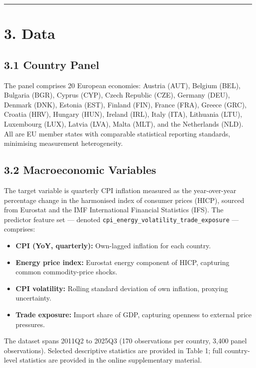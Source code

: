 \documentclass[
]{article}
\providecommand{\tightlist}{%
  \setlength{\itemsep}{0pt}\setlength{\parskip}{0pt}}
\begin{document}
\begin{center}\rule{0.5\linewidth}{0.5pt}\end{center}

\section{3. Data}\label{data}

\subsection{3.1 Country Panel}\label{country-panel}

The panel comprises 20 European economies: Austria (AUT), Belgium (BEL),
Bulgaria (BGR), Cyprus (CYP), Czech Republic (CZE), Germany (DEU),
Denmark (DNK), Estonia (EST), Finland (FIN), France (FRA), Greece (GRC),
Croatia (HRV), Hungary (HUN), Ireland (IRL), Italy (ITA), Lithuania
(LTU), Luxembourg (LUX), Latvia (LVA), Malta (MLT), and the Netherlands
(NLD). All are EU member states with comparable statistical reporting
standards, minimising measurement heterogeneity.

\subsection{3.2 Macroeconomic Variables}\label{macroeconomic-variables}

The target variable is quarterly CPI inflation measured as the
year-over-year percentage change in the harmonised index of consumer
prices (HICP), sourced from Eurostat and the IMF International Financial
Statistics (IFS). The predictor feature set --- denoted
\texttt{cpi\_energy\_volatility\_trade\_exposure} --- comprises:

\begin{itemize}
\tightlist
\item
  \textbf{CPI (YoY, quarterly):} Own-lagged inflation for each country.
\item
  \textbf{Energy price index:} Eurostat energy component of HICP,
  capturing common commodity-price shocks.
\item
  \textbf{CPI volatility:} Rolling standard deviation of own inflation,
  proxying uncertainty.
\item
  \textbf{Trade exposure:} Import share of GDP, capturing openness to
  external price pressures.
\end{itemize}

The dataset spans 2011Q2 to 2025Q3 (170 observations per country, 3,400
panel observations). Selected descriptive statistics are provided in
Table 1; full country-level statistics are provided in the online
supplementary material.
\end{document}
